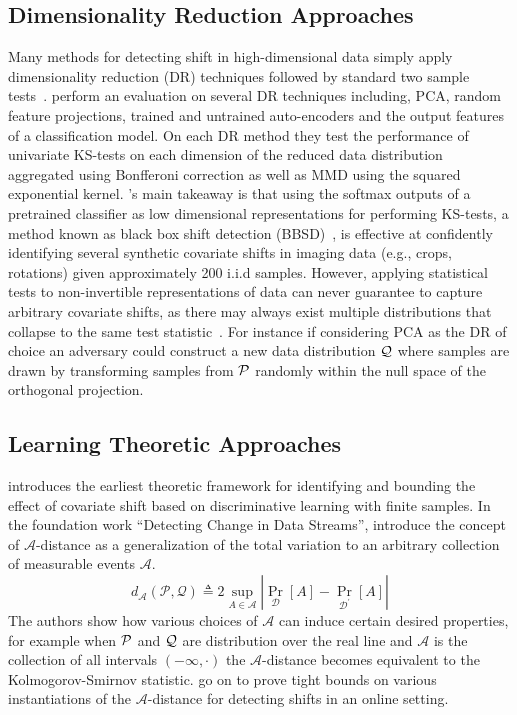 \subsection*{Dimensionality Reduction Approaches}
Many methods for detecting shift in high-dimensional data simply apply dimensionality reduction (DR) techniques followed by standard two sample tests~\citep{failloud}.
\citeauthor{failloud} perform an evaluation on several DR techniques including, PCA, random feature projections, trained and untrained auto-encoders and the output features of a classification model.
On each DR method they test the performance of univariate KS-tests on each dimension of the reduced data distribution aggregated using Bonfferoni correction as well as MMD using the squared exponential kernel.
\citeauthor{failloud}'s main takeaway is that using the softmax outputs of a pretrained classifier as low dimensional representations for performing KS-tests, a method known as black box
shift detection (BBSD)~\citep{bbsd}, is effective at confidently identifying several synthetic covariate shifts in imaging data (e.g., crops, rotations) given approximately 200 i.i.d samples.
However, applying statistical tests to non-invertible representations of data can never guarantee to capture arbitrary covariate shifts, as there may always exist multiple distributions that collapse to
the same test statistic~\citep{failuresofgen}.
For instance if considering PCA as the DR of choice an adversary could construct a new data distribution $\mathcal{Q}$ where samples are drawn by transforming samples from $\mathcal{P}$ randomly within the null space of the orthogonal projection.

\subsection*{Learning Theoretic Approaches}
\cite{domainrep} introduces the earliest theoretic framework for identifying and bounding the effect of covariate shift based on discriminative learning with finite samples.
In the foundation work ``Detecting Change in Data Streams'', \citeauthor{atheory} introduce the concept of $\mathcal{A}$-distance as a generalization of the total variation to an arbitrary collection of measurable events $\mathcal{A}$.
\begin{equation}
    d_{\mathcal{A}}\left(\mathcal{P}, \mathcal{Q} \right)\triangleq2 \sup _{A \in \mathcal{A}}\left|\operatorname{Pr}_{\mathcal{D}}[A]-\operatorname{Pr}_{\mathcal{D}^{\prime}}[A]\right|\label{eq:total-var}
\end{equation}
The authors show how various choices of $\mathcal{A}$ can induce certain desired properties, for example when $\mathcal{P}$ and $\mathcal{Q}$ are distribution over the real line and $\mathcal{A}$ is the collection of all intervals $(-\infty, \cdot)$
the $\mathcal{A}$-distance becomes equivalent to the Kolmogorov-Smirnov statistic.
\citeauthor{atheory} go on to prove tight bounds on various instantiations of the $\mathcal{A}$-distance for detecting shifts in an online setting.

